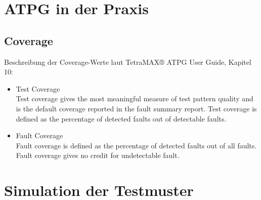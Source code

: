 \documentclass[12pt,a4paper]{article}
\begin{document}
\section{ATPG in der Praxis}


\subsection{Coverage}
Beschreibung der Coverage-Werte laut TetraMAX® ATPG User Guide, Kapitel 10:
\begin{itemize}

\item Test Coverage\\
Test coverage gives the most meaningful measure of test pattern quality and is the default
coverage reported in the fault summary report. Test coverage is defined as the percentage
of detected faults out of detectable faults.

\item Fault Coverage\\
Fault coverage is defined as the percentage of detected faults out of all faults.
Fault coverage gives no credit for undetectable fault.

\end{itemize}

\section{Simulation der Testmuster}

\end{document}
